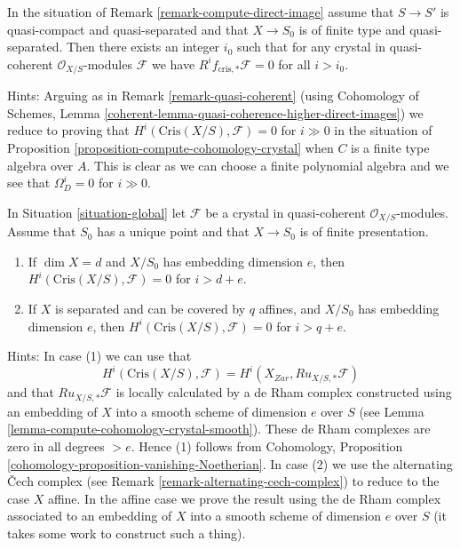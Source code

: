 \begin{remark}[Boundedness]
\label{remark-bounded-cohomology}
In the situation of Remark \ref{remark-compute-direct-image}
assume that $S \to S'$ is quasi-compact and quasi-separated and
that $X \to S_0$ is of finite type and quasi-separated. Then there exists
an integer $i_0$ such that for any crystal
in quasi-coherent $\mathcal{O}_{X/S}$-modules $\mathcal{F}$
we have $R^if_{\text{cris}, *}\mathcal{F} = 0$ for all $i > i_0$.

\medskip\noindent
Hints: Arguing as in Remark \ref{remark-quasi-coherent} (using
Cohomology of Schemes, Lemma
\ref{coherent-lemma-quasi-coherence-higher-direct-images})
we reduce to proving that $H^i(\text{Cris}(X/S), \mathcal{F}) = 0$ for $i \gg 0$
in the situation of Proposition \ref{proposition-compute-cohomology-crystal}
when $C$ is a finite type algebra over $A$. This is clear as we can
choose a finite polynomial algebra and we see that $\Omega^i_D = 0$
for $i \gg 0$.
\end{remark}

\begin{remark}
\label{remark-bounded-cohomology-over-point}
In Situation \ref{situation-global} let $\mathcal{F}$ be a crystal in
quasi-coherent $\mathcal{O}_{X/S}$-modules. Assume that $S_0$
has a unique point and that $X \to S_0$ is of finite presentation.
\begin{enumerate}
\item If $\dim X = d$ and $X/S_0$ has embedding dimension $e$, then
$H^i(\text{Cris}(X/S), \mathcal{F}) = 0$ for $i > d + e$.
\item If $X$ is separated and can be covered by $q$ affines, and
$X/S_0$ has embedding dimension $e$, then
$H^i(\text{Cris}(X/S), \mathcal{F}) = 0$ for $i > q + e$.
\end{enumerate}
Hints: In case (1) we can use that
$$
H^i(\text{Cris}(X/S), \mathcal{F}) = H^i(X_{Zar}, Ru_{X/S, *}\mathcal{F})
$$
and that $Ru_{X/S, *}\mathcal{F}$ is locally calculated by a de Rham
complex constructed using an embedding of $X$ into a smooth scheme
of dimension $e$ over $S$
(see Lemma \ref{lemma-compute-cohomology-crystal-smooth}).
These de Rham complexes are zero in all degrees $>e$. Hence (1)
follows from Cohomology, Proposition
\ref{cohomology-proposition-vanishing-Noetherian}.
In case (2) we use the alternating {\v C}ech complex (see
Remark \ref{remark-alternating-cech-complex}) to reduce to the case
$X$ affine. In the affine case we prove the result using the de Rham complex
associated to an embedding of $X$ into a smooth scheme of dimension $e$
over $S$ (it takes some work to construct such a thing).
\end{remark}

